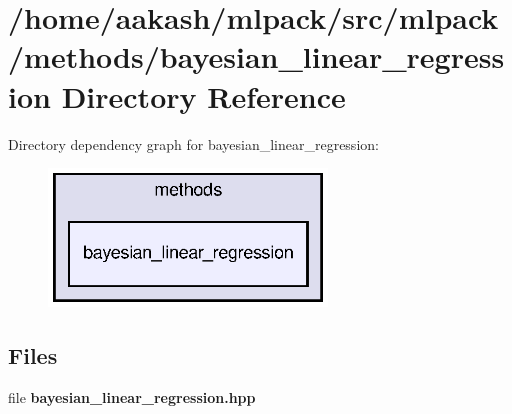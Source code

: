 \section{/home/aakash/mlpack/src/mlpack/methods/bayesian\+\_\+linear\+\_\+regression Directory Reference}
\label{dir_2d12642280fdb077ac311b8d583628a0}
Directory dependency graph for bayesian\+\_\+linear\+\_\+regression\+:
\nopagebreak
\begin{figure}[H]
\begin{center}
\leavevmode
\includegraphics[width=210pt]{dir_2d12642280fdb077ac311b8d583628a0_dep}
\end{center}
\end{figure}
\subsection*{Files}
\begin{DoxyCompactItemize}
\item 
file \textbf{ bayesian\+\_\+linear\+\_\+regression.\+hpp}
\end{DoxyCompactItemize}
